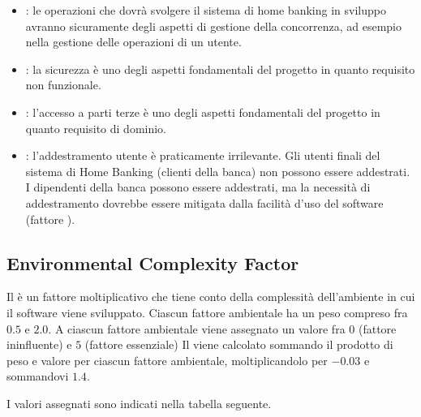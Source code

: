 \begin{itemize}
	\item {}: le operazioni che dovr\`a svolgere il sistema di home banking in sviluppo avranno sicuramente degli aspetti di gestione della concorrenza, ad esempio nella gestione delle operazioni di un utente.
	\item {}: la sicurezza \`e uno degli aspetti fondamentali del progetto in quanto requisito non funzionale.
	\item {}: l'accesso a parti terze \`e uno degli aspetti fondamentali del progetto in quanto requisito di dominio.
	\item {}: l'addestramento utente \`e praticamente irrilevante.
		Gli utenti finali del sistema di Home Banking (clienti della banca) non possono essere addestrati.
		I dipendenti della banca possono essere addestrati, ma la necessit\`a di addestramento dovrebbe essere mitigata dalla facilit\`a d'uso del software (fattore ).
\end{itemize}

\subsection{Environmental Complexity Factor}

Il  \`e un fattore moltiplicativo che tiene conto della complessit\`a dell'ambiente in cui il software viene sviluppato.
Ciascun fattore ambientale ha un peso compreso fra $0.5$ e $2.0$.
A ciascun fattore ambientale viene assegnato un valore fra $0$ (fattore ininfluente) e $5$ (fattore essenziale)
Il  viene calcolato sommando il prodotto di peso e valore per ciascun fattore ambientale, moltiplicandolo per $-0.03$ e sommandovi $1.4$.

I valori assegnati sono indicati nella tabella seguente.


